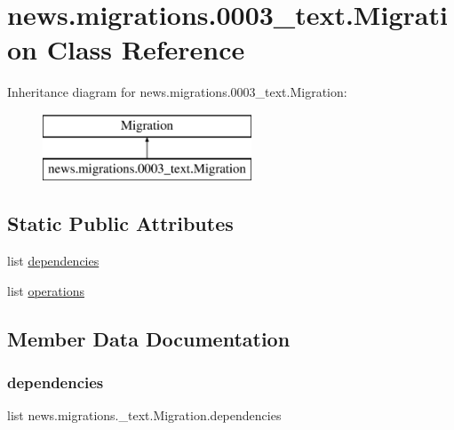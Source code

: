 \hypertarget{classnews_1_1migrations_1_10003__text_1_1_migration}{}\section{news.\+migrations.0003\+\_\+text.Migration Class Reference}
\label{classnews_1_1migrations_1_10003__text_1_1_migration}
Inheritance diagram for news.\+migrations.0003\+\_\+text.Migration\+:\begin{figure}[H]
\begin{center}
\leavevmode
\includegraphics[height=2.000000cm]{classnews_1_1migrations_1_10003__text_1_1_migration}
\end{center}
\end{figure}
\subsection*{Static Public Attributes}
\begin{DoxyCompactItemize}
\item 
list \mbox{\hyperlink{classnews_1_1migrations_1_10003__text_1_1_migration_a6d0db3dbb85d6adb6ffe672d6b5138ca}{dependencies}}
\item 
list \mbox{\hyperlink{classnews_1_1migrations_1_10003__text_1_1_migration_a3cb1f86200fa9c7e658488f99ddb088a}{operations}}
\end{DoxyCompactItemize}


\subsection{Member Data Documentation}
\mbox{\label{classnews_1_1migrations_1_10003__text_1_1_migration_a6d0db3dbb85d6adb6ffe672d6b5138ca}} 
\subsubsection{\texorpdfstring{dependencies}{dependencies}}
{\footnotesize\ttfamily list news.\+migrations.\+\_\+text.\+Migration.\+dependencies\hspace{0.3cm}{\ttfamily [static]}}


